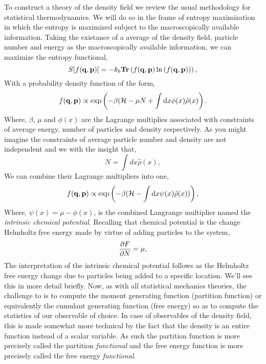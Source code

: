 To construct a theory of the density field we review the usual methodology for statistical thermodynamics. We will do so in the frame of entropy maximization in which the entropy is maximized subject to the macroscopically available information. Taking the existance of a average of the density field, particle number and energy as the macroscopically available information, we can maximize the entropy functional, 
\begin{equation}
    S[f(\mathbf{q}, \mathbf{p})] = -k_b \mathbf{Tr}\left( f(\mathbf{q}, \mathbf{p})\ln\left(f(\mathbf{q}, \mathbf{p})\right) \right),
\end{equation}
With a probability density function of the form,
\begin{equation}
    f(\mathbf{q}, \mathbf{p}) \propto \exp\left(-\beta(\mathcal{H} -\mu N + \int \mathrm{d}x \phi(x)\hat{\rho}(x)\right).
\end{equation}
Where, $\beta$, $\mu$ and $\phi(x)$ are the Lagrange multiplies associated with constraints of average energy, number of particles and density respectively. As you might imagine the constraints of average particle number and density are not independent and we with the insight that,
\begin{equation}
    N = \int dx \hat{\rho}(x),
\end{equation}
We can combine their Lagrange multipliers into one,
\begin{equation}
    f(\mathbf{q}, \mathbf{p}) \propto \exp\left(- \beta(\mathcal{H} - \int \mathrm{d}x \psi(x) \hat{\rho}(x))\right),
\end{equation}
Where, $\psi(x) = \mu - \phi(x)$, is the combined Langrange multiplier named the \textit{intrinsic chemical potential}. Recalling that chemical potential is the change Helmholtz free energy made by virtue of adding particles to the system,
\begin{equation}
    \frac{\partial F}{\partial N} = \mu,
\end{equation}
The interpretation of the intrinsic chemical potential follows as the Helmholtz free energy change due to particles being added to a specific location.
We'll see this in more detail briefly.
Now, as with all statistical mechanics theories, the challenge to is to compute the moment generating function (partition function) or equivalently the cumulant generating function (free energy) so as to compute the statistics of our observable of choice.
In case of observables of the density field, this is made somewhat more technical by the fact that the density is an entire function instead of a scalar variable.
As such the partition function is more precisely called the partition \textit{functional} and the free energy function is more precisely called the free energy \textit{functional}.
